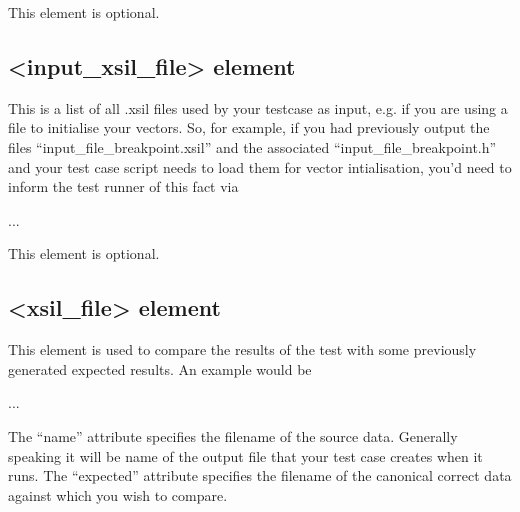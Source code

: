 \documentclass[letterpaper,10pt,english]{sphinxmanual}
\begin{document}
\sphinxAtStartPar
This element is optional.


\subsection{\textless{}input\_xsil\_file\textgreater{} element}
\label{\detokenize{developer:input-xsil-file-element}}\label{\detokenize{developer:inputxsilfileelement}}
\sphinxAtStartPar
This is a list of all .xsil files used by your testcase as input, e.g. if you are using a file to initialise your vectors. So, for example, if you had previously output the files “input\_file\_breakpoint.xsil” and the associated “input\_file\_breakpoint.h” and your test case script needs to load them for vector intialisation, you’d need to inform the test runner of this fact via

\begin{sphinxVerbatim}[commandchars=\\\{\}]
    
  ...
\end{sphinxVerbatim}

\sphinxAtStartPar
This element is optional.


\subsection{\textless{}xsil\_file\textgreater{} element}
\label{\detokenize{developer:xsil-file-element}}\label{\detokenize{developer:xsilfileelement}}
\sphinxAtStartPar
This element is used to compare the results of the test with some previously generated expected results. An example would be

\begin{sphinxVerbatim}[commandchars=\\\{\}]
       
  ...
\end{sphinxVerbatim}

\sphinxAtStartPar
The “name” attribute specifies the filename of the source data. Generally speaking it will be name of the output file that your test case creates when it runs. The “expected” attribute specifies the filename of the canonical correct data against which you wish to compare.
\end{document}
